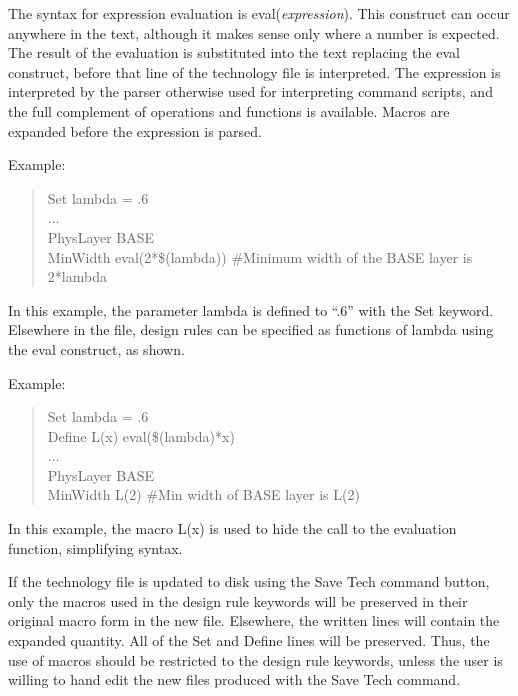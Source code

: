 The syntax for expression evaluation is {\vt eval({\it expression\/})}. 
This construct can occur anywhere in the text, although it makes sense
only where a number is expected.  The result of the evaluation is
substituted into the text replacing the {\vt eval} construct, before
that line of the technology file is interpreted.  The expression is
interpreted by the parser otherwise used for interpreting command
scripts, and the full complement of operations and functions is
available.  Macros are expanded before the expression is parsed.

Example:
\begin{quote}\vt
Set lambda = .6\\
...\\
PhysLayer BASE\\
MinWidth eval(2*\$(lambda))  \#Minimum width of the BASE layer is 2*lambda
\end{quote}

In this example, the parameter {\vt lambda} is defined to ``.6'' with
the {\vt Set} keyword.  Elsewhere in the file, design rules can be
specified as functions of {\vt lambda} using the {\vt eval} construct,
as shown.

Example:

\begin{quote}\rr\vt
Set lambda = .6\\
Define L(x) eval(\$(lambda)*x)\\
...\\

PhysLayer BASE\\
MinWidth L(2)  \#Min width of BASE layer is L(2)\\
\end{quote}

In this example, the macro {\vt L(x)} is used to hide the call to the
evaluation function, simplifying syntax.

If the technology file is updated to disk using the {\cb Save Tech}
command button, only the macros used in the design rule keywords will
be preserved in their original macro form in the new file.  Elsewhere,
the written lines will contain the expanded quantity.  All of the {\vt
Set} and {\vt Define} lines will be preserved.  Thus, the use of
macros should be restricted to the design rule keywords, unless the
user is willing to hand edit the new files produced with the {\cb Save
Tech} command.


